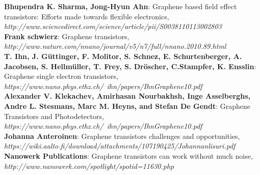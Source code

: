 \documentclass[conference]{IEEEtran}
\begin{document}
\begin{thebibliography}{6}

\textbf{Bhupendra K. Sharma, Jong-Hyun Ahn}: Graphene based field effect transistors: Efforts made towards flexible electronics,
\\\textit{http://www.sciencedirect.com/science/article/pii/S0038110113002803}\\

\textbf{Frank schwierz}: Graphene transistors,
\\\textit{http://www.nature.com/nnano/journal/v5/n7/full/nnano.2010.89.html}\\

\textbf{T. Ihn, J. Güttinger, F. Molitor, S. Schnez, E. Schurtenberger, A. Jacobsen, S. Hellmüller, T. Frey, S. Dröscher, C.Stampfer, K. Ensslin}: Graphene single electron transistors,
\\\textit{https://www.nano.phys.ethz.ch/~ihn/papers/IhnGraphene10.pdf}\\

\textbf{Alexander V. Klekachev, Amirhasan Nourbakhsh, Inge Asselberghs, Andre L. Stesmans, Marc M. Heyns, and Stefan De Gendt}: Graphene Transistors and Photodetectors,
\\\textit{https://www.nano.phys.ethz.ch/~ihn/papers/IhnGraphene10.pdf}\\

\textbf{Johanna Anteroinen}: Graphene transistors challenges and opportunities,
\\\textit{https://wiki.aalto.fi/download/attachments/107190425/Johannanlisuri.pdf}\\

\textbf{Nanowerk Publications}: Graphene transistors can work without much noise,
\\\textit{http://www.nanowerk.com/spotlight/spotid=11630.php}

\end{thebibliography}
\end{document}
